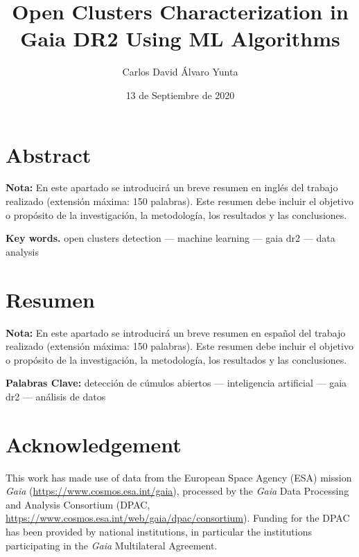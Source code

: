 \documentclass[11pt, a4paper, english]{book}
\title{Open Clusters Characterization in Gaia DR2 Using ML Algorithms}
\author{Carlos David Álvaro Yunta}
\date{13 de Septiembre de 2020}
\begin{document}

\maketitle

\frontmatter
\tableofcontents
\listoffigures
\listoftables

\chapter{Abstract}

{\bf Nota:} En este apartado se introducirá un breve resumen en inglés del trabajo realizado (extensión máxima: 150 palabras).
Este resumen debe incluir el objetivo o propósito de la investigación, la metodología, los resultados y las conclusiones.

\medskip

{\bf Key words.} open clusters detection --- machine learning --- gaia dr2 --- data analysis

\chapter{Resumen}

{\bf Nota:} En este apartado se introducirá un breve resumen en español del trabajo realizado (extensión máxima: 150 palabras).
Este resumen debe incluir el objetivo o propósito de la investigación, la metodología, los resultados y las conclusiones.

\medskip

{\bf Palabras Clave:} detección de cúmulos abiertos --- inteligencia artificial --- gaia dr2 --- análisis de datos

\chapter{Acknowledgement}

This work has made use of data from the European Space Agency (ESA) mission
{\it Gaia} (\url{https://www.cosmos.esa.int/gaia}), processed by the {\it Gaia}
Data Processing and Analysis Consortium (DPAC,
\url{https://www.cosmos.esa.int/web/gaia/dpac/consortium}). Funding for the DPAC
has been provided by national institutions, in particular the institutions
participating in the {\it Gaia} Multilateral Agreement.
\end{document}
